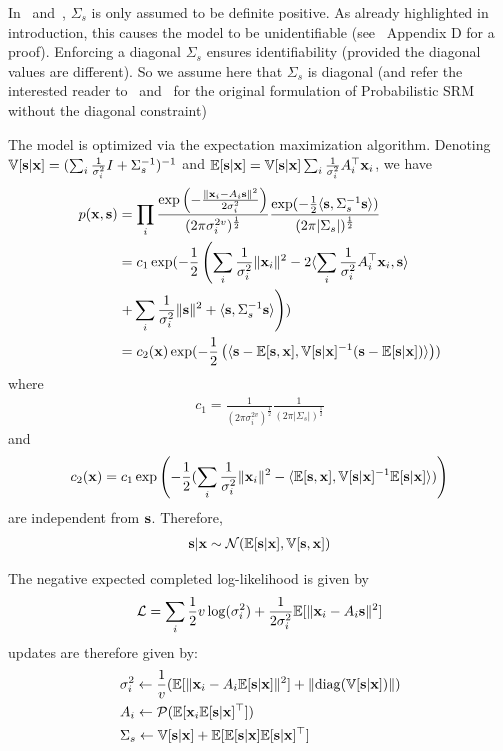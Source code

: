 \documentclass{article}
\begin{document}
In~\cite{chen2015reduced} and~\cite{anderson2016enabling}, $\Sigma_s$ is only assumed to be definite positive.
%
As already highlighted in introduction, this causes the model to be
unidentifiable (see~\cite{richard2020modeling} Appendix D for a proof). Enforcing a diagonal $\Sigma_s$ ensures identifiability (provided the diagonal values are different).
%
So we assume here that $\Sigma_s$ is diagonal (and refer the interested reader
to~\cite{chen2015reduced} and~\cite{anderson2016enabling} for the original formulation of Probabilistic SRM
without the diagonal constraint)
%



The model is optimized via the expectation maximization algorithm.
%
Denoting $\mathbb{V}[\mathbf{s} | \mathbf{x}] = (\sum_i \frac1{\sigma_i^2} I +
\Sigma_s^{-1})^{-1}$ and $\mathbb{E}[\mathbf{s} | \mathbf{x}] = \mathbb{V}[\mathbf{s} | \mathbf{x}] \sum_i \frac1{\sigma_i^2}
A_i^{\top}\mathbf{x}_i$, we have
\begin{align}
  p(\mathbf{x}, \mathbf{s}) &= \prod_i \frac{\exp \left(-\frac{\|\mathbf{x}_i - A_i \mathbf{s} \|^2}{2 \sigma_i^2} \right) }{(2 \pi \sigma_i^{2v})^{\frac12}} \frac{\exp(-\frac12 \langle{ \mathbf{s}},{ \Sigma_s^{-1} \mathbf{s} }\rangle )}{(2 \pi | \Sigma_s|)^{\frac12}} \\
               &= c_1 \exp (-\frac12 \left( \sum_i \frac1{\sigma_i^2}\|\mathbf{x}_i\|^2 - 2  \langle{ \sum_i \frac1{\sigma_i^2} A_i^{\top}\mathbf{x}_i},{ \mathbf{s} }\rangle \right. \\& \left.+ \sum_i \frac1{\sigma_i^2} \| \mathbf{s} \|^2 + \langle{ \mathbf{s}},{ \Sigma_s^{-1} \mathbf{s} }\rangle  \right)) \\
               &= c_2(\mathbf{x}) \exp(-\frac12 \left( \langle{  \mathbf{s}- \mathbb{E}[\mathbf{s}},{ \mathbf{x}], \mathbb{V}[\mathbf{s} | \mathbf{x}]^{-1} ( \mathbf{s} - \mathbb{E}[\mathbf{s} | \mathbf{x}])  }\rangle \right)) \label{probsrmcompleted}
\end{align}
where
\begin{align}
  c_1 = \frac1{(2 \pi \sigma_i^{2v})^{\frac12}}\frac1{(2 \pi |
  \Sigma_s|)^{\frac12}}
\end{align}
and
\begin{align}
  c_2(\mathbf{x}) = c_1 \exp \left( -\frac12( \sum_i
  \frac1{\sigma_i^2}\|\mathbf{x}_i\|^2 - \langle{  \mathbb{E}[\mathbf{s}},{ \mathbf{x}], \mathbb{V}[\mathbf{s} | \mathbf{x}]^{-1}
  \mathbb{E}[\mathbf{s} | \mathbf{x}] }\rangle) \right)
\end{align}
are independent from $\mathbf{s}$.
%
Therefore,
\begin{align}
  \mathbf{s}| \mathbf{x} \sim \mathcal{N}(\mathbb{E}[\mathbf{s} | \mathbf{x}], \mathbb{V}[\mathbf{s}, \mathbf{x}])
\end{align}

The negative expected completed log-likelihood is given by
\begin{align}
	\mathcal{L} = \sum_i \frac12 v \log(\sigma_i^2) + \frac1{2 \sigma_i^2} \mathbb{E}[\| \mathbf{x}_i - A_i \mathbf{s} \|^2]
\end{align}
updates are therefore given by:
\begin{align}
  &\sigma_i^2 \leftarrow \frac1{v} (\mathbb{E}[\| \mathbf{x}_i - A_i \mathbb{E}[\mathbf{s}|\mathbf{x}]\|^2] + \| {\rm diag}(\mathbb{V}[\mathbf{s} | \mathbf{x}]) \|) \\
  &A_i \leftarrow \mathcal{P}(\mathbb{E}[\mathbf{x}_i \mathbb{E}[\mathbf{s}|\mathbf{x}]^{\top}]) \label{eq:psrm:Aiupdate} \\
  & \Sigma_s \leftarrow \mathbb{V}[\mathbf{s} | \mathbf{x}] + \mathbb{E}[\mathbb{E}[\mathbf{s} | \mathbf{x}] \mathbb{E}[\mathbf{s} | \mathbf{x}]^{\top}]
\end{align}
\end{document}
